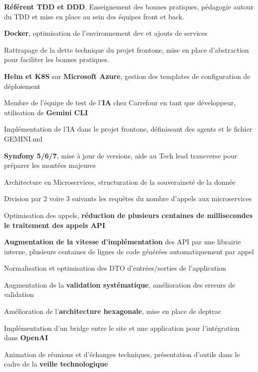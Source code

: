 \begin{cventries}
\begin{cvexperience}
		\begin{cvitems} %
			\item {\textbf{Référent TDD et DDD}. Enseignement des bonnes pratiques, pédagogie autour du TDD et mise en place au sein des équipes front et back.}
			\item {\textbf{Docker}, optimisation de l'environnement dev et ajouts de services}
			\item {Rattrapage de la dette technique du projet frontone, mise en place d'abstraction pour faciliter les bonnes pratiques.}
			\item {\textbf{Helm et K8S} sur \textbf{Microsoft Azure}, gestion des templates de configuration de déploiement}
			\item {Membre de l'équipe de test de l'\textbf{IA} chez Carrefour en tant que développeur, utilisation de \textbf{Gemini CLI}}
			\item {Implémentation de l'IA dans le projet frontone, définissant des agents et le fichier GEMINI.md}
			\item {\textbf{Symfony 5/6/7}, mise à jour de versions, aide au Tech lead transverse pour préparer les montées majeures}
			\item {Architecture en Microservices, structuration de la souveraineté de la donnée}
			\item {Division par 2 voire 3 suivants les requêtes du nombre d'appels aux microservices}
			\item {Optimisation des appels, \textbf{réduction de plusieurs centaines de millisecondes le traitement des appels API}}
			\item {\textbf{Augmentation de la vitesse d'implémentation} des API par une librairie interne, plusieurs centaines de lignes de code générées automatiquement par appel}
			\item {Normalisation et optimisation des DTO d'entrées/sorties de l'application}
			\item {Augmentation de la \textbf{validation systématique}, amélioration des erreurs de validation}
			\item {Amélioration de l'\textbf{architecture hexagonale}, mise en place de deptrac}
			\item {Implémentation d'un bridge entre le site et une application pour l'intégration dans \textbf{OpenAI}}
			\item {Animation de réunions et d'échanges techniques, présentation d'outils dans le cadre de la \textbf{veille technologique}}
		\end{cvitems}


\end{cvexperience}
\end{cventries}

